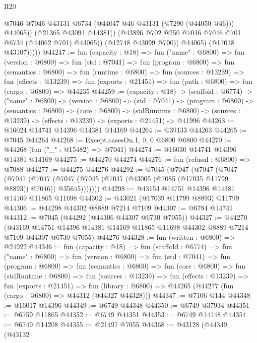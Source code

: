 \begin{lexlean}{R20}
\begin{coremodule}
{                        @7046
                        @7046
                        @43131
                        @6734
                        (@44047 @46 @43131 (@7290 (@44050 @46)))
                        @44065))
                    (@21365 @43091 @14381))
                  (@43896 @702 @250 @7046 @7046 @701 @6734 (@44062 @701) @44065))
                (@12748 @43099 @700))
              @44065)
            (@17018 @43107)))))
@44247 := fun (capacity : @18) =>
  fun ("name" : @6800) =>
  fun (version : @6800) =>
  fun (std : @7041) =>
  fun (program : @6800) =>
  fun (semantics : @6800) =>
  fun (runtime : @6800) =>
  fun (sources : @13239) =>
  fun (effects : @13239) =>
  fun (exports : @21451) => fun (path : @6800) => fun (cargo : @6800) => @44235
@44259 := (capacity : @18) ->
  (scaffold : @6774) ->
  ("name" : @6800) ->
  (version : @6800) ->
  (std : @7041) ->
  (program : @6800) ->
  (semantics : @6800) ->
  (core : @6800) ->
  (stdRuntime : @6800) -> (sources : @13239) -> (effects : @13239) -> (exports : @21451) -> @41996
@44263 := @16024 @14741 @14396 @14381 @14169
@44264 := @39133 @44263
@44265 := @7045 @44264
@44268 := Except.casesOn.{1, 0, 0} @6800 @6800
@44270 := @44268 (fun ("_" : @15482) => @7041)
@44274 := @16030 @14741 @14396 @14381 @14169
@44275 := @44270 @44274
@44276 := fun (refusal : @6800) => @7088
@44277 := @44275 @44276
@44292 := @7045
    (@7047
      (@7047
        (@7047
          (@7047
            (@7047 (@7047 (@7045 (@7047 (@43005 (@7085 (@17035 @11799 @8893)) @7046)) @35645)))))))
@44298 := @43154 @14751 @14396 @14381 @14169 @11865 @11698
@44302 := @43021 (@17039 @11799 @8893) @11799
@44306 := @44298 @44302 @8889 @7214 @7109
@44307 := @6784 @14741
@44312 := @7045 (@44292 (@44306 @44307 @6730 @7055))
@44327 := @44270
    (@43169 @14751 @14396 @14381 @14169 @11865 @11698 @44302 @8889 @7214 @7109 @44307 @6730 @7055)
    @44276
@44328 := fun (written : @6800) => @24922
@44346 := fun (capacity : @18) =>
  fun (scaffold : @6774) =>
  fun ("name" : @6800) =>
  fun (version : @6800) =>
  fun (std : @7041) =>
  fun (program : @6800) =>
  fun (semantics : @6800) =>
  fun (core : @6800) =>
  fun (stdRuntime : @6800) =>
  fun (sources : @13239) =>
  fun (effects : @13239) =>
  fun (exports : @21451) =>
  fun (library : @6800) => @44265 (@44277 (fun (cargo : @6800) => @44312 (@44327 @44328)))
@44347 := @7106 @144
@44348 := @16017 @14396
@44349 := @6749 @44348
@44350 := @6749 @37934
@44351 := @6759 @11865
@44352 := @6749 @44351
@44353 := @6749 @14148
@44354 := @6749 @14208
@44355 := @21497 @7055
@44368 := @43128
    (@44349
      (@43132
}
\end{coremodule}
\end{lexlean}
